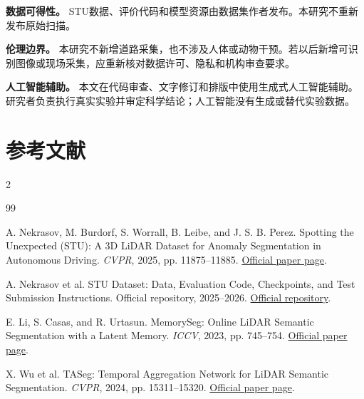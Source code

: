 \documentclass[UTF8,a4paper,zihao=5,fontset=none]{ctexart}
\begin{document}
\noindent\textbf{数据可得性。} STU数据、评价代码和模型资源由数据集作者发布\cite{stuofficial}。本研究不重新发布原始扫描。

\noindent\textbf{伦理边界。} 本研究不新增道路采集，也不涉及人体或动物干预。若以后新增可识别图像或现场采集，应重新核对数据许可、隐私和机构审查要求。

\noindent\textbf{人工智能辅助。} 本文在代码审查、文字修订和排版中使用生成式人工智能辅助。研究者负责执行真实实验并审定科学结论；人工智能没有生成或替代实验数据。

\section*{参考文献}
\begin{multicols}{2}
\fontsize{7.4pt}{8.5pt}\selectfont
\renewcommand{\bibsection}{}
\begin{thebibliography}{99}
\setlength{\itemsep}{0.25em}
\setlength{\parskip}{0pt}

A. Nekrasov, M. Burdorf, S. Worrall, B. Leibe, and J. S. B. Perez. Spotting the Unexpected (STU): A 3D LiDAR Dataset for Anomaly Segmentation in Autonomous Driving. \textit{CVPR}, 2025, pp. 11875--11885.
\href{https://openaccess.thecvf.com/content/CVPR2025/html/Nekrasov_Spotting_the_Unexpected_STU_A_3D_LiDAR_Dataset_for_Anomaly_CVPR_2025_paper.html}{Official paper page}.

A. Nekrasov et al. STU Dataset: Data, Evaluation Code, Checkpoints, and Test Submission Instructions. Official repository, 2025--2026.
\href{https://github.com/kumuji/stu_dataset}{Official repository}.

E. Li, S. Casas, and R. Urtasun. MemorySeg: Online LiDAR Semantic Segmentation with a Latent Memory. \textit{ICCV}, 2023, pp. 745--754.
\href{https://openaccess.thecvf.com/content/ICCV2023/html/Li_MemorySeg_Online_LiDAR_Semantic_Segmentation_ICCV_2023_paper.html}{Official paper page}.

X. Wu et al. TASeg: Temporal Aggregation Network for LiDAR Semantic Segmentation. \textit{CVPR}, 2024, pp. 15311--15320.
\href{https://openaccess.thecvf.com/content/CVPR2024/html/Wu_TASeg_Temporal_Aggregation_Network_for_LiDAR_Semantic_Segmentation_CVPR_2024_paper.html}{Official paper page}.

\end{thebibliography}
\end{multicols}
\end{document}

